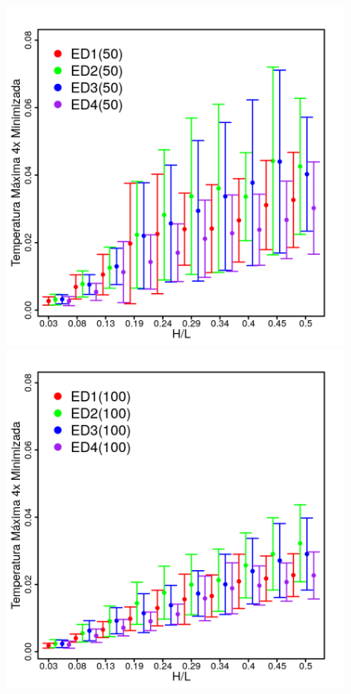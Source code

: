 \documentclass[12pt,A4,A4pt]{article}
\begin{document}
\begin{figure}[!htbp]
\centering
\includegraphics[scale=.91]{imgs/plot_deall50_rdata_std_003-05.png}
\quad
\includegraphics[scale=.91]{imgs/plot_deall100_rdata_std_003-05.png}

\end{figure}
\end{document}
